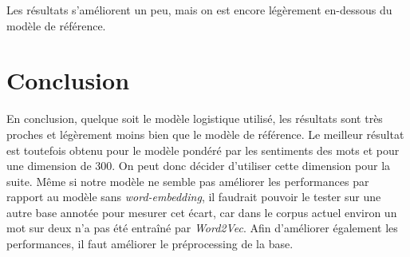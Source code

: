 \documentclass[11pt,french,french]{article}
\begin{document}
Les résultats s'améliorent un peu, mais on est encore légèrement
en-dessous du modèle de référence.

\section{Conclusion}\label{conclusion}

En conclusion, quelque soit le modèle logistique utilisé, les résultats
sont très proches et légèrement moins bien que le modèle de référence.
Le meilleur résultat est toutefois obtenu pour le modèle pondéré par les
sentiments des mots et pour une dimension de 300. On peut donc décider
d'utiliser cette dimension pour la suite. Même si notre modèle ne semble
pas améliorer les performances par rapport au modèle sans
\emph{word-embedding}, il faudrait pouvoir le tester sur une autre base
annotée pour mesurer cet écart, car dans le corpus actuel environ un mot
sur deux n'a pas été entraîné par \emph{Word2Vec}. Afin d'améliorer
également les performances, il faut améliorer le préprocessing de la
base.
\end{document}
